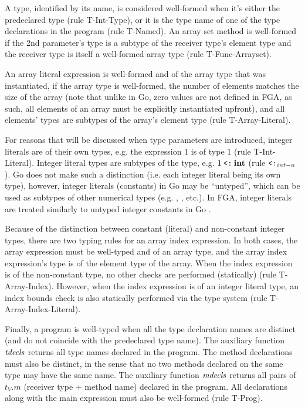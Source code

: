 A type, identified by its name, is considered well-formed when it's either the
predeclared  type (rule T-Int-Type), or it is the type name of one of
the type declarations in the program (rule T-Named). An array set method is
well-formed if the 2nd parameter's type is a subtype of the receiver type's
element type and the receiver type is itself a well-formed array type (rule
T-Func-Arrayset).

An array literal expression is well-formed and of the array type that was
instantiated, if the array type is well-formed, the number of elements matches
the size of the array (note that unlike in Go, zero values are not defined in
FGA, as such, all elements of an array must be explicitly instantiated upfront),
and all elements' types are subtypes of the array's element type (rule
T-Array-Literal).

For reasons that will be discussed when type parameters are introduced, integer
literals are of their own types, e.g. the expression $1$ is of type $1$ (rule
T-Int-Literal). Integer literal types are subtypes of the  type, e.g. $1
    \mathbin{\texttt{<:}} \texttt{\bf int}$ (rule $\mathbin{\texttt{<:}}_{int-n}$). Go does not make such a distinction (i.e.
each integer literal being its own type), however, integer literals (constants)
in Go may be ``untyped'', which can be used as subtypes of other numerical types
(e.g. , ,  etc.). In FGA, integer literals are
treated similarly to untyped integer constants in Go \autocite{spec}.

Because of the distinction between constant (literal) and non-constant integer
types, there are two typing rules for an array index expression. In both cases,
the array expression must be well-typed and of an array type, and the array
index expression's type is of the element type of the array. When the index
expression is of the non-constant  type, no other checks are performed
(statically) (rule T-Array-Index). However, when the index expression is of an
integer literal type, an index bounds check is also statically performed via the
type system (rule T-Array-Index-Literal).

Finally, a program is well-typed when all the type declaration names are
distinct (and do not coincide with the predeclared  type name). The
auxiliary function $\mathit{tdecls}$ returns all type names declared in the program. The
method declarations must also be distinct, in the sense that no two methods
declared on the same type may have the same name. The auxiliary function
$\mathit{mdecls}$ returns all pairs of $t_V.m$ (receiver type + method name) declared in
the program. All declarations along with the main expression must also be
well-formed (rule T-Prog).

